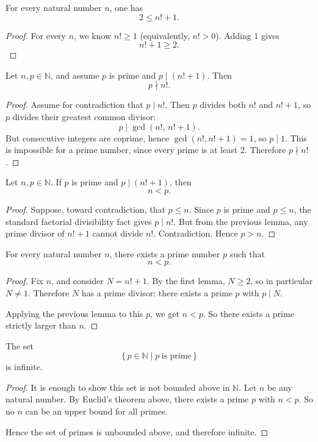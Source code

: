 \begin{lemma}
For every natural number $n$, one has
\[
2 \le n! + 1.
\]
\end{lemma}

\begin{proof}
For every $n$, we know $n! \ge 1$ (equivalently, $n!>0$). Adding $1$ gives
\[
n!+1 \ge 2.
\]
\end{proof}

\begin{lemma}
Let $n,p\in\mathbb{N}$, and assume $p$ is prime and $p\mid (n!+1)$. Then
\[
p\nmid n!.
\]
\end{lemma}

\begin{proof}
Assume for contradiction that $p\mid n!$. Then $p$ divides both $n!$ and $n!+1$, so $p$ divides their greatest common divisor:
\[
p \mid \gcd(n!,\,n!+1).
\]
But consecutive integers are coprime, hence $\gcd(n!,n!+1)=1$, so $p\mid 1$. This is impossible for a prime number, since every prime is at least $2$. Therefore $p\nmid n!$.
\end{proof}

\begin{lemma}
Let $n,p\in\mathbb{N}$. If $p$ is prime and $p\mid (n!+1)$, then
\[
n<p.
\]
\end{lemma}

\begin{proof}
Suppose, toward contradiction, that $p\le n$. Since $p$ is prime and $p\le n$, the standard factorial divisibility fact gives $p\mid n!$. But from the previous lemma, any prime divisor of $n!+1$ cannot divide $n!$. Contradiction. Hence $p>n$.
\end{proof}

\begin{theorem}
For every natural number $n$, there exists a prime number $p$ such that
\[
n<p.
\]
\end{theorem}

\begin{proof}
Fix $n$, and consider $N=n!+1$. By the first lemma, $N\ge 2$, so in particular $N\ne 1$. Therefore $N$ has a prime divisor: there exists a prime $p$ with $p\mid N$.

Applying the previous lemma to this $p$, we get $n<p$. So there exists a prime strictly larger than $n$.
\end{proof}

\begin{theorem}
The set
\[
\{\,p\in\mathbb{N}\mid p\ \text{is prime}\,\}
\]
is infinite.
\end{theorem}

\begin{proof}
It is enough to show this set is not bounded above in $\mathbb{N}$. Let $n$ be any natural number. By Euclid's theorem above, there exists a prime $p$ with $n<p$. So no $n$ can be an upper bound for all primes.

Hence the set of primes is unbounded above, and therefore infinite.
\end{proof}
